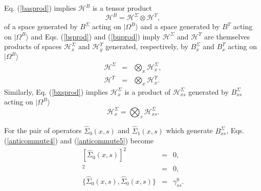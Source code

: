 \documentclass[12pt,amsmath,amssymb,onecolumn]{revtex4-2}
\begin{document}
Eq. (\ref{basprod}) implies
$\mathcal{H}^B$ is a tensor product
\begin{equation}
  \label{hprod}
  \mathcal{H}^B = \mathcal{H}^\Sigma \otimes \mathcal{H}^\Upsilon,
\end{equation}
of a space generated by $B^\Sigma$ acting on $|\Omega^B \rangle $ and a
space generated by $B^\Upsilon$ acting on $|\Omega^B \rangle $ and
Eqs. (\ref{bsprod}) and (\ref{buprod}) imply
$\mathcal{H}^\Sigma$ and $\mathcal{H}^\Upsilon$ are themselves
products of spaces $\mathcal{H}^\Sigma_x$ and $\mathcal{H}^\Upsilon_y$
generated, respectively, by $B^\Sigma_x$ and $B^\Upsilon_x$
acting on $|\Omega^B \rangle $
\begin{subequations}
\begin{eqnarray}
    \label{hsprod}
    \mathcal{H}^\Sigma &=&  \bigotimes_x \mathcal{H}^\Sigma_x, \\
    \label{huprod}
    \mathcal{H}^\Upsilon &=&  \bigotimes_x \mathcal{H}^\Upsilon_x.
\end{eqnarray}
\end{subequations}
Similarly, Eq. (\ref{bxsprod}) implies $\mathcal{H}^\Sigma_x$ is
a product of $\mathcal{H}^\Sigma_{xs}$
generated by $B^\Sigma_{xs}$ acting on $|\Omega^B \rangle $
\begin{equation}
    \label{hsxprod}
    \mathcal{H}^\Sigma_x =  \bigotimes_s \mathcal{H}^\Sigma_{xs}.
\end{equation}

For the pair of operators $\hat{\Sigma}_0(x,s)$
and $\hat{\Sigma}_1(x,s)$ which generate $B^\Sigma_{xs}$,
Eqs. (\ref{anticommute4}) and (\ref{anticommute5}) become
\begin{subequations}
  \begin{eqnarray}
    \label{sigmaeq0}
          [\hat{\Sigma}_0( x, s)] ^ 2 & = & 0, \\
    \label{sigmaeq1}
          [\hat{\Sigma}_1( x, s)] ^ 2 & = & 0, \\
    \label{sigmaeq01}
    \{\hat{\Sigma}_0( x, s), \hat{\Sigma}_0( x, s)\} & = & \gamma^0_{ss}.
  \end{eqnarray}
\end{subequations}
\end{document}
